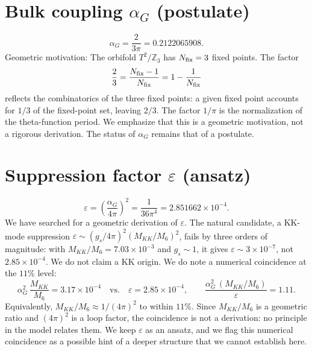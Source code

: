 \documentclass[12pt,a4paper]{article}
\numberwithin{equation}{section}
\begin{document}
\section{Bulk coupling \(\alpha_G\) (postulate)}
\begin{equation}
\alpha_G = \frac{2}{3\pi} = 0.2122065908.
\end{equation}
Geometric motivation: The orbifold \(T^2/\mathbb{Z}_3\) has \(N_{\rm fix}=3\) fixed points. The factor
\begin{equation}
\frac{2}{3} = \frac{N_{\rm fix}-1}{N_{\rm fix}} = 1 - \frac{1}{N_{\rm fix}}
\end{equation}
reflects the combinatorics of the three fixed points: a given fixed point accounts for \(1/3\) of the fixed-point set, leaving \(2/3\). The factor \(1/\pi\) is the normalization of the theta-function period. We emphasize that this is a geometric motivation, not a rigorous derivation. The status of \(\alpha_G\) remains that of a postulate.

\section{Suppression factor \(\varepsilon\) (ansatz)}
\begin{equation}
\varepsilon = \left(\frac{\alpha_G}{4\pi}\right)^2 = \frac{1}{36\pi^4} = 2.851662\times10^{-4}.
\end{equation}
We have searched for a geometric derivation of \(\varepsilon\). The natural candidate, a KK-mode suppression \(\varepsilon \sim (g_s/4\pi)^2 (M_{KK}/M_6)^2\), fails by three orders of magnitude: with \(M_{KK}/M_6 = 7.03\times10^{-3}\) and \(g_s \sim 1\), it gives \(\varepsilon \sim 3\times10^{-7}\), not \(2.85\times10^{-4}\). We do not claim a KK origin. We do note a numerical coincidence at the \(11\%\) level:
\begin{equation}
\alpha_G^2\,\frac{M_{KK}}{M_6} = 3.17\times10^{-4}
\quad\text{vs.}\quad
\varepsilon = 2.85\times10^{-4},
\qquad
\frac{\alpha_G^2\,(M_{KK}/M_6)}{\varepsilon} = 1.11.
\end{equation}
Equivalently, \(M_{KK}/M_6 \approx 1/(4\pi)^2\) to within \(11\%\). Since \(M_{KK}/M_6\) is a geometric ratio and \((4\pi)^2\) is a loop factor, the coincidence is not a derivation: no principle in the model relates them. We keep \(\varepsilon\) as an ansatz, and we flag this numerical coincidence as a possible hint of a deeper structure that we cannot establish here.
\end{document}
